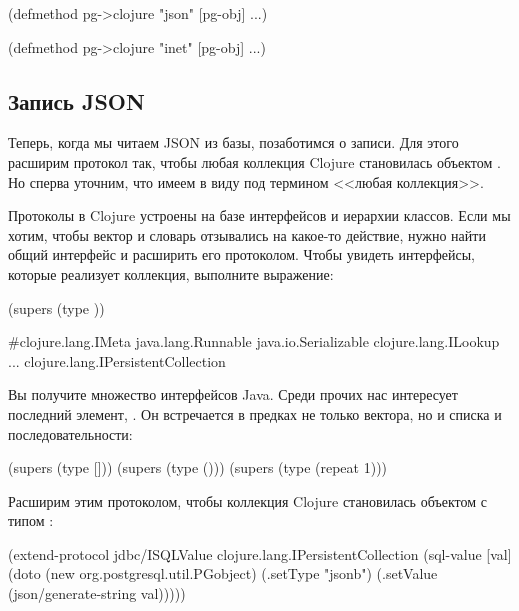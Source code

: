 \begin{english}
  \begin{clojure}
(defmethod pg->clojure "json"
  [pg-obj]
  ...)

(defmethod pg->clojure "inet"
  [pg-obj]
  ...)
  \end{clojure}
\end{english}

\subsection{Запись JSON}

Теперь, когда мы читаем JSON из базы, позаботимся о записи. Для этого расширим протокол  так, чтобы любая коллекция Clojure становилась объектом . Но сперва уточним, что имеем в виду под термином <<любая коллекция>>.

Протоколы в Clojure устроены на базе интерфейсов и иерархии классов. Если мы хотим, чтобы вектор и словарь отзывались на какое-то действие, нужно найти общий интерфейс и расширить его протоколом. Чтобы увидеть интерфейсы, которые реализует коллекция, выполните выражение:

\begin{english}
  \begin{clojure}
(supers (type {}))

#{clojure.lang.IMeta
  java.lang.Runnable
  java.io.Serializable
  clojure.lang.ILookup
  ...
  clojure.lang.IPersistentCollection}
  \end{clojure}
\end{english}

Вы получите множество интерфейсов Java. Среди прочих нас интересует последний элемент, . Он встречается в предках не только вектора, но и списка и последовательности:

\begin{english}
  \begin{clojure}
(supers (type []))
(supers (type ()))
(supers (type (repeat 1)))
  \end{clojure}
\end{english}

Расширим  этим протоколом, чтобы коллекция Clojure становилась объектом  с типом :

\begin{english}
  \begin{clojure}
(extend-protocol jdbc/ISQLValue
  clojure.lang.IPersistentCollection
  (sql-value [val]
    (doto (new org.postgresql.util.PGobject)
      (.setType "jsonb")
      (.setValue (json/generate-string val)))))
  \end{clojure}
\end{english}

